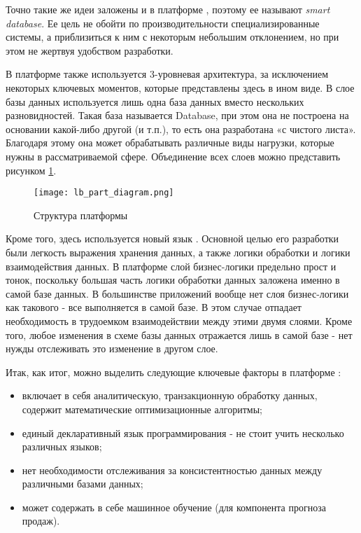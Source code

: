 Точно такие же идеи заложены и в платформе \LB, поэтому ее называют \emph{smart database}. Ее цель не обойти по производительности специализированные системы, а приблизиться к ним с некоторым небольшим отклонением, но при этом не жертвуя удобством разработки.

В платформе \LB также используется 3-уровневая архитектура, за исключением некоторых ключевых моментов, которые представлены здесь в ином виде. В слое базы данных используется лишь одна база данных вместо нескольких разновидностей. Такая база называется \LB Database, при этом она не построена на основании какой-либо другой (\postgres и т.п.), то есть она разработана «с чистого листа». Благодаря этому она может обрабатывать различные виды нагрузки, которые нужны в рассматриваемой сфере. Объединение всех слоев можно представить рисунком \ref{fig:technology:logicblox:lb_parts_diagram}.

\begin{figure}
	\centering
	\texttt{[image: lb\_part\_diagram.png]}
	\caption{Структура платформы \cite{query_parallel_execution}}
	\label{fig:technology:logicblox:lb_parts_diagram}
\end{figure}

Кроме того, здесь используется новый язык \logiql. Основной целью его разработки были легкость выражения хранения данных, а также логики обработки и логики взаимодействия данных. В платформе \LB слой бизнес-логики предельно прост и тонок, поскольку большая часть логики обработки данных заложена именно в самой базе данных. В большинстве приложений вообще нет слоя бизнес-логики как такового - все выполняется в самой базе. В этом случае отпадает необходимость в трудоемком взаимодействии между этими двумя слоями. Кроме того, любое изменения в схеме базы данных отражается лишь в самой базе - нет нужды отслеживать это изменение в другом слое.

Итак, как итог, можно выделить следующие ключевые факторы в платформе \LB:

\begin{itemize}
	\item включает в себя аналитическую, транзакционную обработку данных, содержит математические оптимизационные алгоритмы;
	\item единый декларативный язык программирования \logiql - не стоит учить несколько различных языков;
	\item нет необходимости отслеживания за консистентностью данных между различными базами данных;
	\item может содержать в себе машинное обучение (для компонента прогноза продаж).
\end{itemize}

